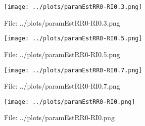 \documentclass[a4paper, 11pt]{report}
\begin{document}
\begin{figure}[h] \caption{File: ../plots/paramEstRR0-RI0.3.png} \texttt{[image: ../plots/paramEstRR0-RI0.3.png]} \end{figure}
\begin{figure}[h] \caption{File: ../plots/paramEstRR0-RI0.5.png} \texttt{[image: ../plots/paramEstRR0-RI0.5.png]} \end{figure}
\begin{figure}[h] \caption{File: ../plots/paramEstRR0-RI0.7.png} \texttt{[image: ../plots/paramEstRR0-RI0.7.png]} \end{figure}
\begin{figure}[h] \caption{File: ../plots/paramEstRR0-RI0.png} \texttt{[image: ../plots/paramEstRR0-RI0.png]} \end{figure}
\end{document}
